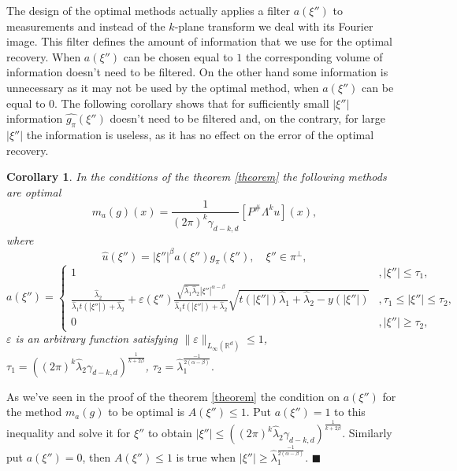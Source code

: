 \documentclass[12pt]{iopart}
\newtheorem{corollary}{Corollary}
\newenvironment{proof}
{\par\noindent{\bf Proof}}
{\hfill$\scriptstyle\blacksquare$}
\begin{document}
	The design of the optimal methods actually applies a filter $a(\xi'')$ to measurements and instead of the $k$-plane transform we deal with its Fourier image. This filter defines the amount of information that we use for the optimal recovery. When $a(\xi'')$ can be chosen equal to $1$ the corresponding volume of information doesn't need to be filtered. On the other hand some information is unnecessary as it may not be used by the optimal method, when $a(\xi'')$ can be equal to $0$. The following corollary shows that for sufficiently small  $|\xi''|$ information $\widehat{g_\pi}(\xi'')$ doesn't need to be filtered and, on the contrary, for large  $|\xi''|$ the information is useless, as it  has no effect on the error of the optimal recovery.
	
	\begin{corollary}
		\label{cor}
		In the conditions of the theorem \ref{theorem} the following methods are optimal 
		$$m_a(g)(x) = \frac{1}{(2\pi)^k\gamma_{d-k,d}}[P^\#\Lambda^ku](x),$$
		where	
		$$\widehat{u}(\xi'')=|\xi''|^\beta a(\xi'')\widehat{g_\pi }(\xi''),\quad \xi''\in\pi^\perp,$$
		\[
		a(\xi'')=
		\begin{cases}
		1& ,|\xi''|\leqslant \tau_1,\\
		\frac{\widehat\lambda_2}{\widehat\lambda_1t(|\xi''|)+\widehat\lambda_2}+\varepsilon(\xi'')\frac{\sqrt{\widehat\lambda_1\widehat\lambda_2}|\xi''|^{\alpha-\beta}}{\widehat\lambda_1t(|\xi''|)+\widehat\lambda_2}\sqrt{t(|\xi''|)\widehat\lambda_1+\widehat\lambda_2-y(|\xi''|)}& ,\tau_1 \leqslant|\xi''|\leqslant\tau_2,\\
		0 &,|\xi''|\geqslant\tau_2,
		\end{cases}
		\]
		$\varepsilon$ is an arbitrary function satisfying $\|\varepsilon\|_{L_\infty(\mathbb R^d)}\leqslant 1$, $\tau_1=((2\pi)^k\widehat\lambda_2\gamma_{d-k,d})^\frac{1}{k+2\beta}$, $\tau_2=\widehat\lambda_1^{\frac{-1}{2(\alpha-\beta)}}.$
	\end{corollary}
	
	\begin{proof}
		As we've seen in the proof of the theorem \ref{theorem} the condition on $a(\xi'')$ for the method $m_a(g)$ to be optimal is $A(\xi'')\leqslant 1$. Put $a(\xi'')=1$ to this inequality and solve it for $\xi''$ to obtain $|\xi''|\leqslant ((2\pi)^k\widehat\lambda_2\gamma_{d-k,d})^\frac{1}{k+2\beta}$. Similarly put $a(\xi'')=0$,
		then $A(\xi'')\leqslant 1$ is true when $|\xi''|\geqslant
		\widehat\lambda_1^{\frac{-1}{2(\alpha-\beta)}}$.
	\end{proof}
	
\end{document}

